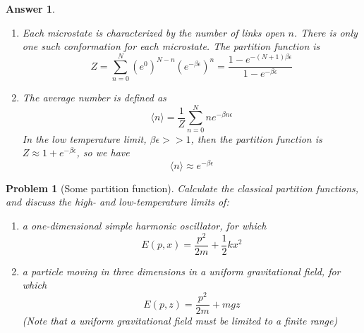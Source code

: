 \documentclass[a4paper]{article}
\theoremstyle{new2}
\newtheorem{ans}{Answer}[section]
\theoremstyle{new}
\newtheorem{qns}{Problem}[section]
\begin{document}
\begin{ans}\leavevmode
\begin{enumerate}[label=(\alph*)]
\item Each microstate is characterized by the number of links open $n$. There is only one such conformation for each microstate. The partition function is
$$Z=\sum_{n=0}^N(e^0)^{N-n}(e^{-\beta\epsilon})^{n}=\frac{1-e^{-(N+1)\beta\epsilon}}{1-e^{-\beta\epsilon}}$$
\item The average number is defined as
$$\langle n\rangle=\frac{1}{Z}\sum_{n=0}^Nne^{-\beta n\epsilon}$$
In the low temperature limit, $\beta\epsilon>>1$, then the partition function is $Z\approx1+e^{-\beta\epsilon}$, so we have
$$\langle n\rangle\approx e^{-\beta\epsilon}$$
\end{enumerate}
\end{ans}
\newpage
\begin{qns}[Some partition function]
Calculate the classical partition functions, and discuss the high- and low-temperature limits of:
\begin{enumerate}[label=(\alph*)]
\item a one-dimensional simple harmonic oscillator, for which
$$E(p,x)=\frac{p^2}{2m}+\frac{1}{2}kx^2$$
\item a particle moving in three dimensions in a uniform gravitational field, for which
$$E(p,z)=\frac{p^2}{2m}+mgz$$
(Note that a uniform gravitational field must be limited to a finite range)
\end{enumerate}
\end{qns}
\end{document}
